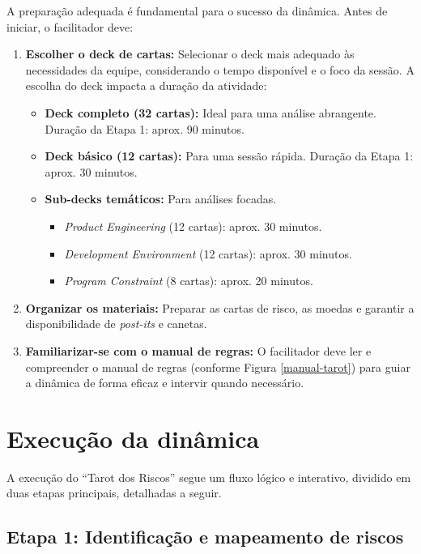\documentclass[
	12pt,
	openright,
	twoside,
	a4paper,
	english,
	brazil
	]{abntex2}
\begin{document}
A preparação adequada é fundamental para o sucesso da dinâmica. Antes de iniciar, o facilitador deve:

\begin{enumerate}
    \item \textbf{Escolher o deck de cartas:} Selecionar o deck mais adequado às necessidades da equipe, considerando o tempo disponível e o foco da sessão. A escolha do deck impacta a duração da atividade:
    \begin{itemize}
        \item \textbf{Deck completo (32 cartas):} Ideal para uma análise abrangente. Duração da Etapa 1: aprox. 90 minutos.
        \item \textbf{Deck básico (12 cartas):} Para uma sessão rápida. Duração da Etapa 1: aprox. 30 minutos.
        \item \textbf{Sub-decks temáticos:} Para análises focadas.
        \begin{itemize}
            \item \textit{Product Engineering} (12 cartas): aprox. 30 minutos.
            \item \textit{Development Environment} (12 cartas): aprox. 30 minutos.
            \item \textit{Program Constraint} (8 cartas): aprox. 20 minutos.
        \end{itemize}
    \end{itemize}
    \item \textbf{Organizar os materiais:} Preparar as cartas de risco, as moedas e garantir a disponibilidade de \textit{post-its} e canetas.
    \item \textbf{Familiarizar-se com o manual de regras:} O facilitador deve ler e compreender o manual de regras (conforme Figura \ref{manual-tarot}) para guiar a dinâmica de forma eficaz e intervir quando necessário.
\end{enumerate}

\section{Execução da dinâmica}
\label{sec:execucao-dinamica}

A execução do “Tarot dos Riscos” segue um fluxo lógico e interativo, dividido em duas etapas principais, detalhadas a seguir.

\subsection{Etapa 1: Identificação e mapeamento de riscos}
\label{sec:identificacao-analise-cap5}
\end{document}

